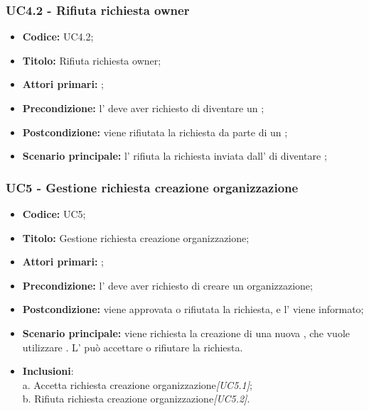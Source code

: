 \documentclass[casi-duso]{subfiles}
\begin{document}
\subsubsection{UC4.2 - Rifiuta richiesta owner}
\label{subsub:UC4.2}

\begin{itemize}
  \item \textbf{Codice:} UC4.2;
  \item \textbf{Titolo:} Rifiuta richiesta owner;
  \item \textbf{Attori primari:} ;
  \item \textbf{Precondizione:} l' deve aver richiesto di diventare un ;
  \item \textbf{Postcondizione:} viene rifiutata la richiesta da parte di un ;
  \item \textbf{Scenario principale:} l' rifiuta la richiesta inviata dall' di diventare ;
\end{itemize}

\subsubsection{UC5 - Gestione richiesta creazione organizzazione}
\label{subsub:UC5}
\begin{itemize}
  \item \textbf{Codice:} UC5;
  \item \textbf{Titolo:} Gestione richiesta creazione organizzazione;
  \item \textbf{Attori primari:} ;
  \item \textbf{Precondizione:} l' deve aver richiesto di creare un organizzazione;
  \item \textbf{Postcondizione:} viene approvata o rifiutata la richiesta, e l' viene informato;
  \item \textbf{Scenario principale:} viene richiesta la creazione di una nuova , che vuole utilizzare . 
  L' può accettare o rifiutare la richiesta.
  \item \textbf{Inclusioni}:
        \\a. Accetta richiesta creazione organizzazione\emph{[UC5.1]};
        \\b. Rifiuta richiesta creazione organizzazione\emph{[UC5.2]}.
\end{itemize}
\end{document}
